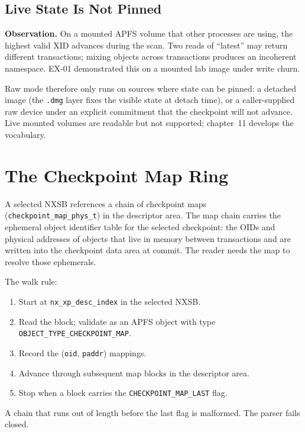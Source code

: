 \subsection{Live State Is Not Pinned}

\textbf{Observation.} On a mounted APFS volume that other processes
are using, the highest valid XID advances during the scan. Two
reads of ``latest'' may return different transactions; mixing
objects across transactions produces an incoherent namespace. EX-01
demonstrated this on a mounted lab image under write churn.

Raw mode therefore only runs on sources where state can be pinned:
a detached image (the \texttt{.dmg} layer fixes the visible state
at detach time), or a caller-supplied raw device under an explicit
commitment that the checkpoint will not advance. Live mounted
volumes are readable but not supported; chapter~11 develops the
vocabulary.

\section{The Checkpoint Map Ring}
\label{ssec:checkpoint-map}

A selected NXSB references a chain of checkpoint maps
(\texttt{checkpoint\_map\_phys\_t}) in the descriptor area. The map
chain carries the ephemeral object identifier table for the selected
checkpoint: the OIDs and physical addresses of objects that live in
memory between transactions and are written into the checkpoint data
area at commit. The reader needs the map to resolve those ephemerals.

The walk rule:

\begin{enumerate}
  \item Start at \texttt{nx\_xp\_desc\_index} in the selected NXSB.
  \item Read the block; validate as an APFS object with type
    \texttt{OBJECT\_TYPE\_CHECKPOINT\_MAP}.
  \item Record the (\texttt{oid}, \texttt{paddr}) mappings.
  \item Advance through subsequent map blocks in the descriptor area.
  \item Stop when a block carries the \texttt{CHECKPOINT\_MAP\_LAST}
    flag.
\end{enumerate}

A chain that runs out of length before the last flag is malformed.
The parser fails closed.

